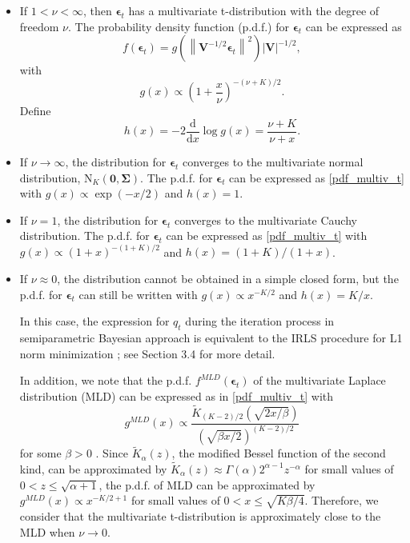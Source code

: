 \documentclass[
]{jss}
\begin{document}
\begin{itemize}
\item
  If \(1<\nu<\infty\), then \(\boldsymbol\epsilon_t\) has a multivariate
  t-distribution with the degree of freedom \(\nu\). The probability
  density function (p.d.f.) for \(\boldsymbol\epsilon_t\) can be
  expressed as \begin{equation}
        \label{pdf_multiv_t}
        f\left( \boldsymbol\epsilon_t \right) = g\left( \left\| \mathbf{V}^{-1/2} \boldsymbol\epsilon_t \right\|^2 \right) \left| \mathbf{V} \right|^{-1/2},
        \end{equation} with \begin{equation}
        g(x) \propto \left(1 + \frac{x}{\nu} \right)^{-(\nu+K)/2}.
        \end{equation} Define \begin{equation}
        \label{hfunction}
        h(x) = -2 \frac{\text{d}}{\text{d}x}  \log g(x) = \frac{\nu + K}{\nu + x}.
        \end{equation}
\item
  If \(\nu \rightarrow \infty\), the distribution for
  \(\boldsymbol\epsilon_t\) converges to the multivariate normal
  distribution, \(\text{N}_K(\mathbf{0}, \mathbf{\Sigma})\). The p.d.f.
  for \(\boldsymbol\epsilon_t\) can be expressed as \eqref{pdf_multiv_t}
  with \(g(x) \propto \exp(-x/2)\) and \(h(x) = 1\).
\item
  If \(\nu = 1\), the distribution for \(\boldsymbol\epsilon_t\)
  converges to the multivariate Cauchy distribution. The p.d.f. for
  \(\boldsymbol\epsilon_t\) can be expressed as \eqref{pdf_multiv_t}
  with \(g(x) \propto (1+x)^{-(1+K)/2}\) and \(h(x) = (1+K)/(1+x)\).
\item
  If \(\nu \approx 0\), the distribution cannot be obtained in a simple
  closed form, but the p.d.f. for \(\boldsymbol\epsilon_t\) can still be
  written with \(g(x) \propto x^{-K/2}\) and \(h(x) = K/x\).

  In this case, the expression for \(q_t\) during the iteration process
  in semiparametric Bayesian approach \citep{LeeChoiKim2016} is
  equivalent to the IRLS procedure for L1 norm minimization
  \citep{Chartrand08}; see Section 3.4 for more detail.

  In addition, we note that the p.d.f.
  \(f^{MLD} (\boldsymbol\epsilon_t)\) of the multivariate Laplace
  distribution (MLD) can be expressed as in \eqref{pdf_multiv_t} with \[
        g^{MLD}(x) \propto \frac{ \tilde{K}_{(K-2)/2} (\sqrt{2x/\beta}) }{ (\sqrt{ \beta x/2 })^{(K-2)/2} }
        \] for some \(\beta>0\) \citep{Eltoft06}. Since
  \(\tilde{K}_\alpha (z)\), the modified Bessel function of the second
  kind, can be approximated by
  \(\tilde{K}_\alpha (z) \approx \Gamma(\alpha) 2^{\alpha-1} z^{-\alpha}\)
  for small values of \(0<z\leq \sqrt{\alpha+1}\), the p.d.f. of MLD can
  be approximated by \(g^{MLD} (x) \propto x^{-K/2+1}\) for small values
  of \(0<x\leq \sqrt{K\beta/4}\). Therefore, we consider that the
  multivariate t-distribution is approximately close to the MLD when
  \(\nu\rightarrow 0\).
\end{itemize}
\end{document}
